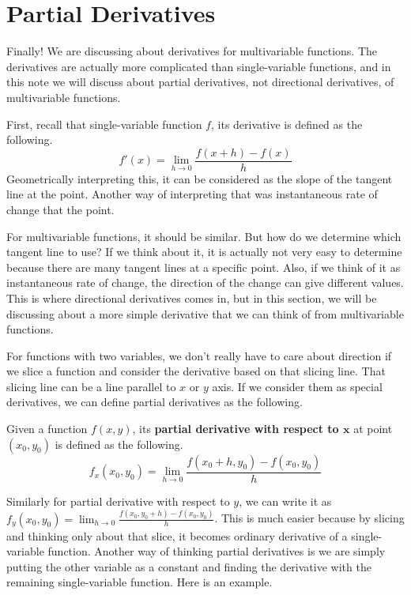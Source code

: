 \documentclass[../../../main.tex]{subfiles}
\begin{document}
\section{Partial Derivatives}

Finally! We are discussing about derivatives for multivariable
functions. The derivatives are actually more complicated than
single-variable functions, and in this note we will discuss about
partial derivatives, not directional derivatives, of multivariable
functions.

First, recall that single-variable function $f$, its derivative is
defined as the following.
\[
f'(x) = \lim_{h \to 0} \frac{f(x + h) - f(x)}{h}
\]
Geometrically interpreting this, it can be considered as the slope
of the tangent line at the point. Another way of interpreting that
was instantaneous rate of change that the point.

For multivariable functions, it should be similar. But how do we
determine which tangent line to use? If we think about it, it is
actually not very easy to determine because there are many tangent
lines at a specific point. Also, if we think of it as instantaneous
rate of change, the direction of the change can give different values.
This is where directional derivatives comes in, but in this section,
we will be discussing about a more simple derivative that we can
think of from multivariable functions.

For functions with two variables, we don't really have to care about
direction if we slice a function and consider the derivative based
on that slicing line. That slicing line can be a line parallel to
$x$ or $y$ axis. If we consider them as special derivatives,
we can define partial derivatives as the following.

\begin{definition}{}{}
Given a function $f(x, y)$, its \textbf{partial derivative with
respect to $\mathbf{x}$} at point $(x_0, y_0)$ is defined as the
following.
\[
f_x (x_0, y_0)
= \lim_{h \to 0} \frac{f(x_0 + h, y_0) - f(x_0, y_0)}{h}
\]
\end{definition}

Similarly for partial derivative with respect to $y$, we can write
it as $f_y (x_0, y_0) = \lim_{h \to 0} \frac{f(x_0, y_0 + h) -
f(x_0, y_0)}{h}$. This is much easier because by slicing and thinking
only about that slice, it becomes ordinary derivative of a
single-variable function. Another way of thinking partial derivatives
is we are simply putting the other variable as a constant and finding
the derivative with the remaining single-variable function.
Here is an example.
\end{document}
